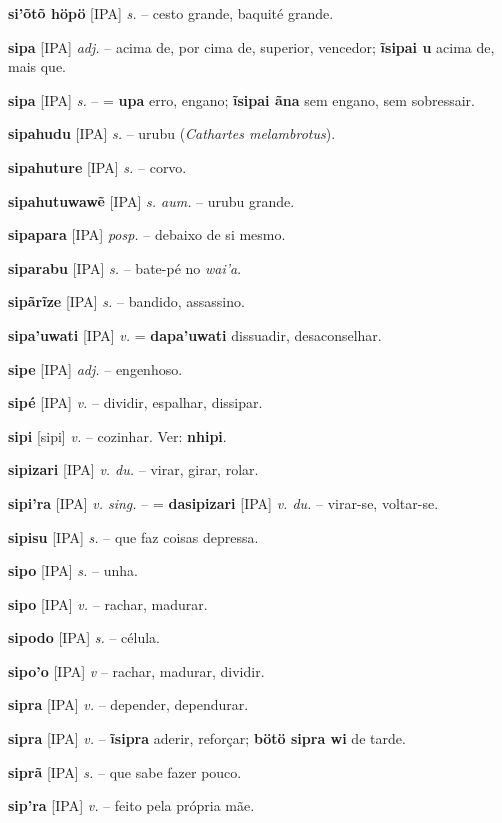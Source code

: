\textbf{si'õtõ höpö} [IPA] \textit{s.} -- cesto grande, baquité grande.

\textbf{sipa} [IPA] \textit{adj.} -- acima de, por cima de, superior, vencedor; \textbf{ĩsipai u} acima de, mais que.

\textbf{sipa} [IPA] \textit{s.} -- = \textbf{upa} erro, engano; \textbf{ĩsipai ãna} sem engano, sem sobressair.

\textbf{sipahudu} [IPA] \textit{s.} -- urubu (\textit{Cathartes melambrotus}).

\textbf{sipahuture} [IPA] \textit{s.} -- corvo.

\textbf{sipahutuwawẽ} [IPA] \textit{s. aum.} -- urubu grande.

\textbf{sipapara} [IPA] \textit{posp.} -- debaixo de si mesmo.

\textbf{siparabu} [IPA] \textit{s.} -- bate-pé no \textit{wai'a}.

\textbf{sipãrĩze} [IPA] \textit{s.} -- bandido, assassino.

\textbf{sipa'uwati} [IPA] \textit{v.} = \textbf{dapa'uwati} dissuadir, desaconselhar.

\textbf{sipe} [IPA] \textit{adj.} -- engenhoso.

\textbf{sipé} [IPA] \textit{v.} -- dividir, espalhar, dissipar.

\textbf{sipi} [sipi] \textit{v.} -- cozinhar. Ver: \textbf{nhipi}.

\textbf{sipizari} [IPA] \textit{v. du.} -- virar, girar, rolar.

\textbf{sipi'ra} [IPA] \textit{v. sing.} -- = \textbf{dasipizari} [IPA] \textit{v. du.} -- virar-se, voltar-se.

\textbf{sipisu} [IPA] \textit{s.} -- que faz coisas depressa.

\textbf{sipo} [IPA] \textit{s.} -- unha.

\textbf{sipo} [IPA] \textit{v.} -- rachar, madurar.

\textbf{sipodo} [IPA] \textit{s.} -- célula.

\textbf{sipo'o} [IPA] \textit{v} -- rachar, madurar, dividir.

\textbf{sipra} [IPA] \textit{v.} -- depender, dependurar.

\textbf{sipra} [IPA] \textit{v.} -- \textbf{ĩsipra} aderir, reforçar; \textbf{bötö sipra wi} de tarde.

\textbf{siprã} [IPA] \textit{s.} -- que sabe fazer pouco.

\textbf{sip'ra} [IPA] \textit{v.} -- feito pela própria mãe.


